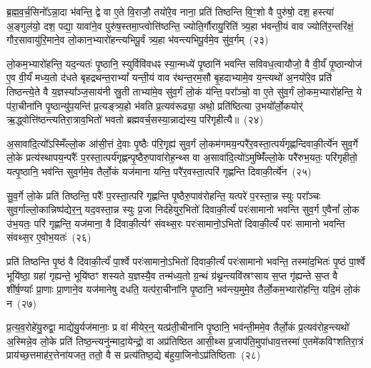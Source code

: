 ब्र॒ह्म॒व॒र्च॒सिनो᳚\-ऽन्ना॒दा भ॑वन्ति॒ द्वे वा ए॒ते वि॒राजौ॒ तयो॑रे॒व नाना॒ प्रति॑ तिष्ठन्ति वि॒ꣳ॒शो वै पुरु॑षो॒ दश॒ हस्त्या॑ अ॒ङ्गुल॑यो॒ दश॒ पद्या॒ यावा॑ने॒व पुरु॑ष॒स्तमा॒प्त्वोत्ति॑ष्ठन्ति॒ ज्योति॒र्गौरायु॒रिति॑ त्र्य॒हा भ॑वन्ती॒यं वाव ज्योति॑र॒न्तरि॑क्षं॒ गौर॒सावायु॑रि॒माने॒व लो॒कान॒भ्यारो॑हन्त्यभिपू॒र्वं त्र्य॒हा भ॑वन्त्यभिपू॒र्वमे॒व सु॑व॒र्गम्~(२३)

लो॒कम॒भ्यारो॑हन्ति॒ यद॒न्यतः॑ पृ॒ष्ठानि॒ स्युर्विवि॑वधꣴ स्या॒न्मध्ये॑ पृ॒ष्ठानि॑ भवन्ति सविवध॒त्वायौजो॒ वै वी॒र्यं॑ पृ॒ष्ठान्योज॑ ए॒व वी॒र्यं॑ मध्य॒तो द॑धते बृहद्रथन्त॒रा\-भ्यां᳚ यन्ती॒यं वाव र॑थन्त॒रम॒सौ बृ॒हदाभ्यामे॒व य॒न्त्यथो॑ अ॒नयो॑रे॒व प्रति॑ तिष्ठन्त्ये॒ते वै य॒ज्ञस्या᳚ञ्ज॒साय॑नी स्रु॒ती ताभ्या॑मे॒व सु॑व॒र्गं लो॒कं य॑न्ति॒ परा᳚ञ्चो॒ वा ए॒ते सु॑व॒र्गं लो॒कम॒भ्यारो॑हन्ति॒ ये प॑रा॒चीना॑नि पृ॒ष्ठान्यु॑प॒यन्ति॑ प्र॒त्यङ्त्र्य॒हो भ॑वति प्र॒त्यव॑रूढ्या॒ अथो॒ प्रति॑ष्ठित्या उ॒भयो᳚र्लो॒कयोर्॑ ऋ॒द्ध्वोत्ति॑ष्ठन्त्यतिरा॒त्राव॒भितो॑ भवतो ब्रह्मवर्च॒सस्या॒न्नाद्य॑स्य॒ परि॑गृहीत्यै॥~(२४)

{\anuvakamend[{वृ॒ञ्ज॒ते॒ ब्रह्म॒ चान्न॑ञ्च सुव॒र्गमे॒ते सु॑व॒र्गन्त्रयो॑विꣳशतिश्च}]}%

अ॒सावा॑दि॒त्यो᳚\-ऽस्मिँल्लो॒क आ॑सी॒त्तं दे॒वाः पृ॒ष्ठैः प॑रि॒गृह्य॑ सुव॒र्गं लो॒कम॑गमय॒न्परै॑र॒वस्ता॒त्पर्य॑गृह्णन्दिवाकी॒र्त्ये॑न सुव॒र्गे लो॒के प्रत्य॑स्थापय॒न्परैः᳚ प॒रस्ता॒त्पर्य॑गृह्णन्पृ॒ष्ठैरु॒पावा॑रोह॒न्थ्स वा अ॒सावा॑दि॒त्यो॑\-ऽमुष्मिँ॑ल्लो॒के परै॑रुभ॒यतः॒ परि॑गृहीतो॒ यत्पृ॒ष्ठानि॒ भव॑न्ति सुव॒र्गमे॒व तैर्लो॒कं यज॑माना यन्ति॒ परै॑र॒वस्ता॒त्परि॑ गृह्णन्ति दिवाकी॒र्त्ये॑न~(२५)

सु॒व॒र्गे लो॒के प्रति॑ तिष्ठन्ति॒ परैः᳚ प॒रस्ता॒त्परि॑ गृह्णन्ति पृ॒ष्ठैरु॒पाव॑रोहन्ति॒ यत्परे॑ प॒रस्ता॒न्न स्युः परा᳚ञ्चः सुव॒र्गाल्लो॒कान्निष्प॑द्येर॒न्॒ यद॒वस्ता॒न्न स्युः प्र॒जा निर्द॑हेयुर॒भितो॑ दिवाकी॒र्त्यं॑ परः॑सामानो भवन्ति सुव॒र्ग ए॒वैनां᳚ लो॒क उ॑भ॒यतः॒ परि॑ गृह्णन्ति॒ यज॑माना॒ वै दि॑वाकी॒र्त्यꣳ॑ संवथ्स॒रः परः॑सामानो॒\-ऽभितो॑ दिवाकी॒र्त्यं॑ परः॑ सामानो भवन्ति संवथ्स॒र ए॒वोभ॒यतः॑~(२६)

प्रति॑ तिष्ठन्ति पृ॒ष्ठं वै दि॑वाकी॒र्त्यं॑ पा॒र्श्वे परः॑सामानो॒\-ऽभितो॑ दिवाकी॒र्त्यं॑ परः॑सामानो भवन्ति॒ तस्मा॑द॒भितः॑ पृ॒ष्ठं पा॒र्श्वे भूयि॑ष्ठा॒ ग्रहा॑ गृह्यन्ते॒ भूयि॑ष्ठꣳ शस्यते य॒ज्ञस्यै॒व तन्म॑ध्य॒तो ग्र॒न्थं ग्र॑थ्न॒न्त्यवि॑स्रꣳसाय स॒प्त गृ॑ह्यन्ते स॒प्त वै शी॑र्\mbox{}ष॒ण्याः᳚ प्रा॒णाः प्रा॒णाने॒व यज॑मानेषु दधति॒ यत्प॑रा॒चीना॑नि पृ॒ष्ठानि॒ भव॑न्त्य॒मुमे॒व तैर्लो॒कम॒भ्यारो॑हन्ति॒ यदि॒मं लो॒कं न~(२७)

प्र॒त्य॒व॒रोहे॑यु॒रुद्वा॒ माद्ये॑यु॒र्यज॑मानाः॒ प्र वा॑ मीयेर॒न्॒ यत्प्र॑ती॒चीना॑नि पृ॒ष्ठानि॒ भव॑न्ती॒ममे॒व तैर्लो॒कं प्र॒त्यव॑रोह॒न्त्यथो॑ अ॒स्मिन्ने॒व लो॒के प्रति॑ तिष्ठ॒न्त्यनु॑न्मादा॒येन्द्रो॒ वा अप्र॑तिष्ठित आसी॒थ्स प्र॒जा\-प॑ति॒मुपा॑धाव॒त्तस्मा॑ ए॒तमे॑कविꣳशतिरा॒त्रं प्राय॑च्छ॒त्तमाह॑र॒त्तेना॑यजत॒ ततो॒ वै स प्रत्य॑तिष्ठ॒द्ये ब॑हुया॒जिनो\-ऽप्र॑तिष्ठिताः~(२८)

